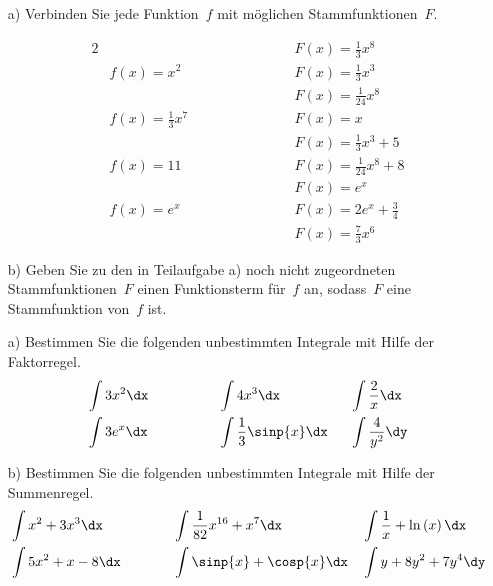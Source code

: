 \begin{itemize}
	\item[a)] Verbinden Sie jede Funktion~$f$ mit möglichen Stammfunktionen~$F$.
	
	\begin{alignat*}{2}
		&						 \qquad \qquad \qquad && F(x)= \frac{1}{3} x^8\\
		&f(x)= x^2				 \qquad \qquad \qquad && F(x)= \frac{1}{3} x^3\\
		&						 \qquad \qquad \qquad && F(x)= \frac{1}{24} x^8\\
		&f(x)= \frac{1}{3} x^7	 \qquad \qquad \qquad && F(x)= x\\
		&						 \qquad \qquad \qquad && F(x)= \frac{1}{3} x^3 + 5\\
		&f(x)= 11				 \qquad \qquad \qquad && F(x)= \frac{1}{24} x^8 + 8\\
		&						 \qquad \qquad \qquad && F(x)= e^x\\
		&f(x)= e^x				 \qquad \qquad \qquad && F(x)= 2 e^x + \frac{3}{4}\\
		&						 \qquad \qquad \qquad && F(x)= \frac{7}{3} x^6
	\end{alignat*}
	\item[b)] Geben Sie zu den in Teilaufgabe a) noch nicht zugeordneten Stammfunktionen~$F$ einen Funktionsterm für~$f$ an, sodass~$F$ eine Stammfunktion von~$f$ ist.
	\end{itemize}
\begin{itemize}
	\item[a)] Bestimmen Sie die folgenden unbestimmten Integrale mit Hilfe der Faktorregel.
	\begin{alignat*}{3}
		& \int 3x^2 \dx \qquad \qquad && \int 4 x^3 \dx \qquad \qquad	&& \int \frac{2}{x} \dx \\
		& \int 3 e^x \dx && \int \frac{1}{3} \sinp{x} \dx && \int \frac{4}{y^2} \dy
	\end{alignat*}
	\item[b)] Bestimmen Sie die folgenden unbestimmten Integrale mit Hilfe der Summenregel.
	\begin{alignat*}{3}
		& \int x^2 + 3 x^3 \dx \qquad \qquad && \int \frac{1}{82} x^{16} + x^7 \dx \qquad \qquad && \int \frac{1}{x} + \ln \left(x\right) \dx\\
		& \int 5 x^2 + x - 8 \dx && \int \sinp{x} + \cosp{x} \dx && \int y + 8y^2 + 7 y^4 \dy\\
	\end{alignat*}
\end{itemize}
